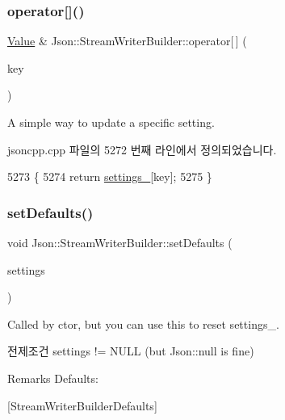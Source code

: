 \subsubsection{\texorpdfstring{operator[]()}{operator[]()}}
{\footnotesize\ttfamily \hyperlink{class_json_1_1_value}{Value} \& Json\+::\+Stream\+Writer\+Builder\+::operator\mbox{[}$\,$\mbox{]} (\begin{DoxyParamCaption}\item[{\hyperlink{json_8h_a1e723f95759de062585bc4a8fd3fa4be}{J\+S\+O\+N\+C\+P\+P\+\_\+\+S\+T\+R\+I\+NG}}]{key }\end{DoxyParamCaption})}

A simple way to update a specific setting. 

jsoncpp.\+cpp 파일의 5272 번째 라인에서 정의되었습니다.


\begin{DoxyCode}
5273 \{
5274   \textcolor{keywordflow}{return} \hyperlink{class_json_1_1_stream_writer_builder_a79bdf2e639a52f4e758c0b95bd1d3423}{settings\_}[key];
5275 \}
\end{DoxyCode}
\mbox{\label{class_json_1_1_stream_writer_builder_a53bf106b141e28637b01ad0ecd2acbf6}} 
\subsubsection{\texorpdfstring{set\+Defaults()}{setDefaults()}}
{\footnotesize\ttfamily void Json\+::\+Stream\+Writer\+Builder\+::set\+Defaults (\begin{DoxyParamCaption}\item[{\hyperlink{class_json_1_1_value}{Json\+::\+Value} $\ast$}]{settings }\end{DoxyParamCaption})\hspace{0.3cm}{\ttfamily [static]}}

Called by ctor, but you can use this to reset settings\+\_\+. \begin{DoxyPrecond}{전제조건}
\textquotesingle{}settings\textquotesingle{} != N\+U\+LL (but Json\+::null is fine) 
\end{DoxyPrecond}
\begin{DoxyRemark}{Remarks}
Defaults\+: 
\begin{DoxyCodeInclude}
\end{DoxyCodeInclude}

\end{DoxyRemark}
\mbox{[}Stream\+Writer\+Builder\+Defaults\mbox{]}

